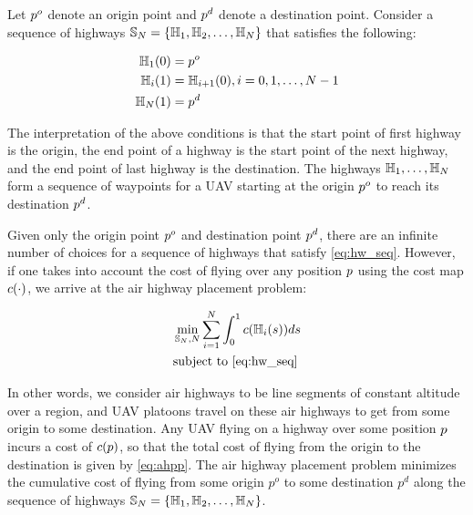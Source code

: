 Let $p^o$ denote an origin point and $p^d$ denote a destination point. Consider a sequence of highways $\mathbb{S}_N = \{\mathbb{H}_1, \mathbb{H}_2, \ldots, \mathbb{H}_N\}$ that satisfies the following:

\begin{equation}
\label{eq:hw_seq}
\begin{aligned}
\mathbb{H}_1(0) &= p^o \\
\mathbb{H}_i(1) &= \mathbb{H}_{i+1}(0), i = 0, 1, \ldots, N-1 \\
\mathbb{H}_N(1) &= p^d \\
\end{aligned}
\end{equation}

The interpretation of the above conditions is that the start point of first highway is the origin, the end point of a highway is the start point of the next highway, and the end point of last highway is the destination. The highways $\mathbb{H}_1,\ldots,\mathbb{H}_N$ form a sequence of waypoints for a UAV starting at the origin $p^o$ to reach its destination $p^d$.

Given only the origin point $p^o$ and destination point $p^d$, there are an infinite number of choices for a sequence of highways that satisfy \eqref{eq:hw_seq}. However, if one takes into account the cost of flying over any position $p$ using the cost map $c(\cdot)$, we arrive at the air highway placement problem:

\begin{equation}
\label{eq:ahpp} %
\begin{aligned}
& \min_{\hws_N, N} \sum_{i=1}^N \int_0^1 \cmap(\hw_i(s)) ds \\
& \text{subject to \eqref{eq:hw_seq}} 
\end{aligned}
\end{equation}

In other words, we consider air highways to be line segments of constant altitude over a region, and UAV platoons travel on these air highways to get from some origin to some destination. Any UAV flying on a highway over some position $p$ incurs a cost of $c(p)$, so that the total cost of flying from the origin to the destination is given by \eqref{eq:ahpp}. The air highway placement problem minimizes the cumulative cost of flying from some origin $p^o$ to some destination $p^d$ along the sequence of highways $\mathbb{S}_N=\{\mathbb{H}_1, \mathbb{H}_2, \ldots, \mathbb{H}_N\}$.

